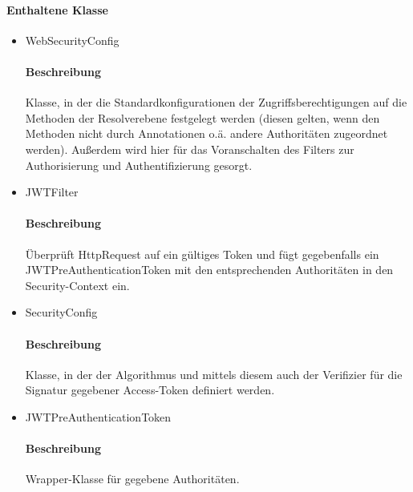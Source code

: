 \paragraph*{Enthaltene Klasse}
\begin{itemize}
	\item WebSecurityConfig
	\paragraph*{Beschreibung}
			Klasse, in der die Standardkonfigurationen der Zugriffsberechtigungen auf die Methoden 
			der Resolverebene festgelegt werden (diesen gelten, wenn den Methoden nicht durch Annotationen o.ä. andere
			Authoritäten zugeordnet werden). Außerdem wird hier für das Voranschalten des Filters zur Authorisierung und Authentifizierung gesorgt.
    \item JWTFilter
    		\paragraph*{Beschreibung}
    		Überprüft HttpRequest auf ein gültiges Token und fügt gegebenfalls ein JWTPreAuthenticationToken mit den entsprechenden Authoritäten in den Security-Context ein.
	\item SecurityConfig
			\paragraph*{Beschreibung}
			Klasse, in der der Algorithmus und mittels diesem auch der Verifizier für die Signatur gegebener Access-Token definiert werden.		
	\item JWTPreAuthenticationToken
    		\paragraph*{Beschreibung}
			Wrapper-Klasse für gegebene Authoritäten.
\end{itemize}

